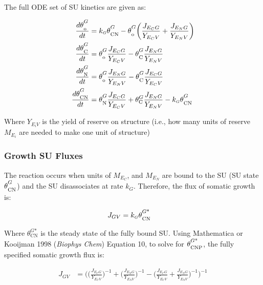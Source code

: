 \documentclass[
]{article}
\begin{document}
The full ODE set of SU kinetics are given as:

\begin{align}
\frac{d\theta\strut_{\text{o}}^G}{dt} &= k_{\scriptscriptstyle G}\theta\strut_{\text{CN}}^{G} - \theta\strut_{\text{o}}^G\biggl(\frac{J_{E_{C}G}}{Y_{{E_C}V}} + \frac{J_{E_{N}G}}{Y_{{E_N}V}}\biggr)
\\
\frac{d\theta\strut_{\text{C}}^G}{dt} &= {\theta\strut_{\text{o}}^G}\frac{J_{E_{C}G}}{Y_{{E_C}V}} - {\theta\strut_{\text{C}}^G}\frac{J_{E_{N}G}}{Y_{{E_N}V}}
\\
\frac{d\theta\strut_{\text{N}}^G}{dt} &= {\theta\strut_{\text{o}}^G}\frac{J_{E_{N}G}}{Y_{{E_N}V}} - {\theta\strut_{\text{C}}^G}\frac{J_{E_{C}G}}{Y_{{E_C}V}}
\\
\frac{d\theta\strut_{\text{CN}}^G}{dt} &= {\theta\strut_{\text{N}}^G}\frac{J_{E_{C}G}}{Y_{{E_C}V}} + {\theta_{\text{C}}^G}\frac{J_{E_{N}G}}{Y_{{E_N}V}} - k_{\scriptscriptstyle G}\theta\strut_{\text{CN}}^{G}
\end{align}

Where \(Y_{{E_i}V}\) is the yield of reserve on structure (i.e., how
many units of reserve \(M_{E_i}\) are needed to make one unit of
structure)

\subsubsection{Growth SU Fluxes}\label{growth-su-fluxes}

The reaction occurs when units of \(M_{E_C}\), and \(M_{E_N}\) are bound
to the SU (SU state \(\theta\strut_{\text{CN}}^G\)) and the SU
disassociates at rate \(k_{\scriptscriptstyle G}\). Therefore, the flux
of somatic growth is:

\begin{align}
J_{GV} &= k_{\scriptscriptstyle G}\theta\strut_{\text{CN}}^{G\text{*}} 
\end{align}

Where \(\theta_{\text{CN}}^{G\text{*}}\) is the steady state of the
fully bound SU. Using Mathematica or Kooijman 1998 (\emph{Biophys Chem})
Equation 10, to solve for \(\theta\strut_{\text{CNP}}^{G\text{*}}\), the
fully specified somatic growth flux is:

\begin{align}
  J_{GV} &= \biggl(\biggl(\frac{J_{E_{C}G}}{Y_{{E_C}V}}\biggr)^{-1} + \biggl(\frac{J_{E_{N}G}}{Y_{{E_N}V}}\biggr)^{-1} - \biggl(\frac{J_{E_{C}G}}{Y_{{E_C}V}} + \frac{J_{E_{N}G}}{Y_{{E_N}V}}\biggr)^{-1}\biggr)^{-1}
\end{align}
\end{document}
